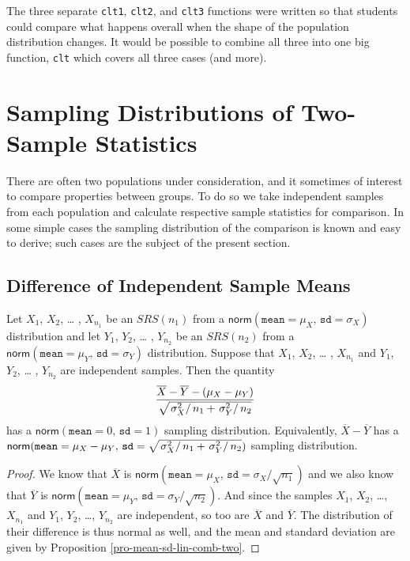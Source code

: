 The three separate \texttt{clt1}, \texttt{clt2}, and \texttt{clt3} functions were written
so that students could compare what happens overall when the shape of
the population distribution changes. It would be possible to combine
all three into one big function, \texttt{clt} which covers all three cases
(and more).

\section{Sampling Distributions of Two-Sample Statistics}
\label{sec-8-4}

There are often two populations under consideration, and it sometimes
of interest to compare properties between groups. To do so we take
independent samples from each population and calculate respective
sample statistics for comparison. In some simple cases the sampling
distribution of the comparison is known and easy to derive; such cases
are the subject of the present section.

\subsection{Difference of Independent Sample Means}
\label{sec-8-4-1}

\begin{prop}
Let \(X_{1}\), \(X_{2}\), \ldots{} , \(X_{n_{1}}\) be an \(SRS(n_{1})\)
from a
\(\mathsf{norm}(\mathtt{mean}=\mu_{X},\,\mathtt{sd}=\sigma_{X})\)
distribution and let \(Y_{1}\), \(Y_{2}\), \ldots{} , \(Y_{n_{2}}\) be an
\(SRS(n_{2})\) from a
\(\mathsf{norm}(\mathtt{mean}=\mu_{Y},\,\mathtt{sd}=\sigma_{Y})\)
distribution. Suppose that \(X_{1}\), \(X_{2}\), \ldots{} , \(X_{n_{1}}\)
and \(Y_{1}\), \(Y_{2}\), \ldots{} , \(Y_{n_{2}}\) are independent
samples. Then the quantity
\begin{equation}
\label{eq-diff-indep-sample-means}
\frac{\overline{X}-\overline{Y}-(\mu_{X}-\mu_{Y})}{\sqrt{\left.\sigma_{X}^{2}\right/ n_{1}+\left.\sigma_{Y}^{2}\right/ n_{2}}}
\end{equation}
has a \(\mathsf{norm}(\mathtt{mean}=0,\,\mathtt{sd}=1)\) sampling
distribution. Equivalently, \(\overline{X}-\overline{Y}\) has a
\(\mathsf{norm}(\mathtt{mean}=\mu_{X}-\mu_{Y},\,\mathtt{sd}=\sqrt{\left.\sigma_{X}^{2}\right/
n_{1}+\left.\sigma_{Y}^{2}\right/ n_{2}})\) sampling distribution.
\end{prop}

\begin{proof}
We know that \(\overline{X}\) is
\(\mathsf{norm}(\mathtt{mean}=\mu_{X},\,\mathtt{sd}=\sigma_{X}/\sqrt{n_{1}})\)
and we also know that \(\overline{Y}\) is
\(\mathsf{norm}(\mathtt{mean}=\mu_{Y},\,\mathtt{sd}=\sigma_{Y}/\sqrt{n_{2}})\). And
since the samples \(X_{1}\), \(X_{2}\), \ldots{}, \(X_{n_{1}}\) and
\(Y_{1}\), \(Y_{2}\), \ldots{}, \(Y_{n_{2}}\) are independent, so too are
\(\overline{X}\) and \(\overline{Y}\). The distribution of their
difference is thus normal as well, and the mean and standard deviation
are given by Proposition \ref{pro-mean-sd-lin-comb-two}.
\end{proof}

